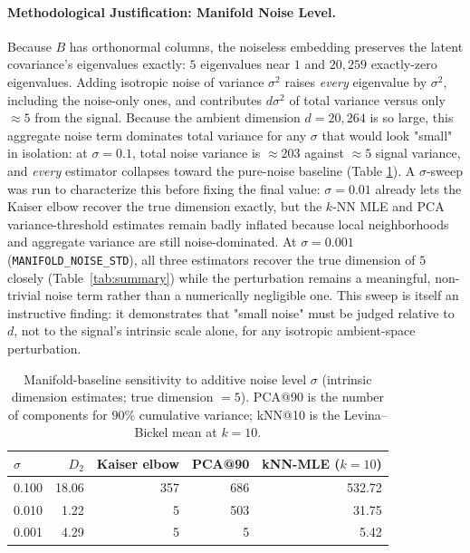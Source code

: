 \documentclass[11pt]{article}
\begin{document}
\paragraph{Methodological Justification: Manifold Noise Level.}
Because $B$ has orthonormal columns, the noiseless embedding preserves the
latent covariance's eigenvalues exactly: $5$ eigenvalues near $1$ and
$20{,}259$ exactly-zero eigenvalues. Adding isotropic noise of variance
$\sigma^2$ raises \emph{every} eigenvalue by $\sigma^2$, including the
noise-only ones, and contributes $d\sigma^2$ of total variance versus only
$\approx 5$ from the signal. Because the ambient dimension $d = 20{,}264$
is so large, this aggregate noise term dominates total variance for any
$\sigma$ that would look "small" in isolation: at $\sigma = 0.1$, total
noise variance is $\approx 203$ against $\approx 5$ signal variance, and
\emph{every} estimator collapses toward the pure-noise baseline (Table
\ref{tab:noise-sweep}). A $\sigma$-sweep was run to characterize this
before fixing the final value: $\sigma = 0.01$ already lets the Kaiser
elbow recover the true dimension exactly, but the $k$-NN MLE and PCA
variance-threshold estimates remain badly inflated because local
neighborhoods and aggregate variance are still noise-dominated. At
$\sigma = 0.001$ (\texttt{MANIFOLD\_NOISE\_STD}), all three estimators
recover the true dimension of $5$ closely (Table~\ref{tab:summary}) while
the perturbation remains a meaningful, non-trivial noise term rather than
a numerically negligible one. This sweep is itself an instructive
finding: it demonstrates that "small noise" must be judged relative to
$d$, not to the signal's intrinsic scale alone, for any isotropic
ambient-space perturbation.

\begin{table}[H]
\centering
\caption{Manifold-baseline sensitivity to additive noise level $\sigma$
(intrinsic dimension estimates; true dimension $=5$). PCA@90 is the
number of components for $90\%$ cumulative variance; kNN@10 is the
Levina--Bickel mean at $k=10$.}
\label{tab:noise-sweep}
\begin{tabular}{lrrrr}
\toprule
$\sigma$ & $D_2$ & Kaiser elbow & PCA@90 & kNN-MLE ($k=10$) \\
\midrule
0.100 & 18.06 & 357 & 686 & 532.72 \\
0.010 & 1.22  & 5   & 503 & 31.75 \\
0.001 & 4.29  & 5   & 5   & 5.42 \\
\bottomrule
\end{tabular}
\end{table}
\end{document}

